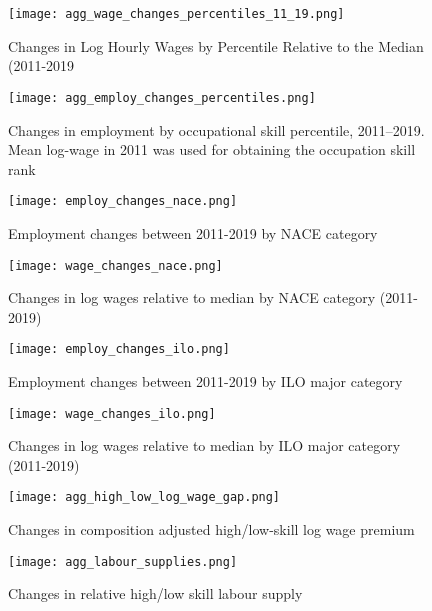 \documentclass{article}
\begin{document}
\begin{figure}[!htbp]%
    \centering
    {\texttt{[image: agg\_wage\_changes\_percentiles\_11\_19.png]} }
    \caption{Changes in Log Hourly Wages by Percentile Relative to the Median (2011-2019}
    \label{agg_wage_changes_percentiles_11_19}
\end{figure}


\begin{figure}[!htbp]%
    \centering
    {\texttt{[image: agg\_employ\_changes\_percentiles.png]} }
    \caption{Changes in employment by occupational skill percentile, 2011–2019. Mean log-wage in 2011 was used for obtaining the occupation skill rank}
    \label{agg_employ_changes_percentiles}
\end{figure}

\begin{figure}[!htbp]%
\centering
    {\texttt{[image: employ\_changes\_nace.png]} }
    \caption{Employment changes between 2011-2019 by NACE category}
\label{employ_changes_nace}
\end{figure}

\begin{figure}[!htbp]%
\centering
    {\texttt{[image: wage\_changes\_nace.png]} }
    \caption{Changes in log wages relative to median by NACE category (2011-2019)}
\label{wage_changes_nace}
\end{figure}

\begin{figure}[!htbp]%
\centering
    {\texttt{[image: employ\_changes\_ilo.png]} }
    \caption{Employment changes between 2011-2019 by ILO major category}
\label{employ_changes_ilo}
\end{figure}

\begin{figure}[!htbp]%
\centering
    {\texttt{[image: wage\_changes\_ilo.png]} }
    \caption{Changes in log wages relative to median by ILO major category (2011-2019)}
\label{wage_changes_ilo}
\end{figure}

\begin{figure}[!htbp]%
    \centering
    {\texttt{[image: agg\_high\_low\_log\_wage\_gap.png]} }
    \caption{Changes in composition adjusted high/low-skill log wage premium}
    \label{agg_high_low_log_wage_gap}
\end{figure}


\begin{figure}[!htbp]%
    \centering
    {\texttt{[image: agg\_labour\_supplies.png]} }
    \caption{Changes in relative high/low skill labour supply}
    \label{agg_labour_supplies}
\end{figure}
\end{document}
